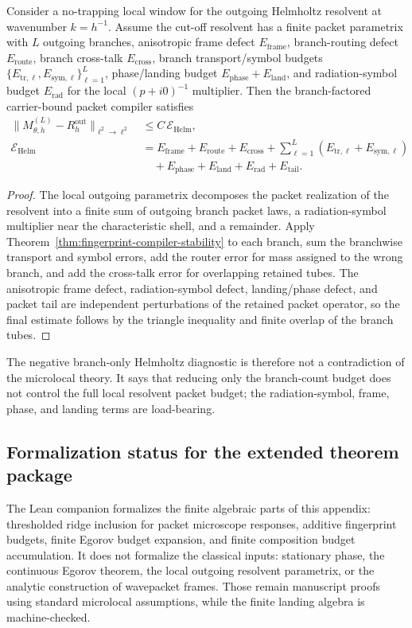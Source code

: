 \begin{theorem}
\label{thm:local-helmholtz-packet-budget}
Consider a no-trapping local window for the outgoing Helmholtz resolvent at
wavenumber $k=h^{-1}$.  Assume the cut-off resolvent has a finite packet
parametrix with $L$ outgoing branches, anisotropic frame defect
$E_{\mathrm{frame}}$, branch-routing defect $E_{\mathrm{route}}$, branch
cross-talk $E_{\mathrm{cross}}$, branch transport/symbol budgets
$\{E_{\mathrm{tr},\ell},E_{\mathrm{sym},\ell}\}_{\ell=1}^L$, phase/landing
budget $E_{\mathrm{phase}}+E_{\mathrm{land}}$, and radiation-symbol budget
$E_{\mathrm{rad}}$ for the local $(p+i0)^{-1}$ multiplier.  Then the
branch-factored carrier-bound packet compiler satisfies
\[
\begin{aligned}
\|M_{\theta,h}^{(L)}-R_h^{\mathrm{out}}\|_{\ell^2\to\ell^2}
&\le C\,\mathcal E_{\mathrm{Helm}},\\
\mathcal E_{\mathrm{Helm}}
&=
E_{\mathrm{frame}}+E_{\mathrm{route}}+E_{\mathrm{cross}}
+\sum_{\ell=1}^L(E_{\mathrm{tr},\ell}+E_{\mathrm{sym},\ell})\\
&\quad
+E_{\mathrm{phase}}+E_{\mathrm{land}}+E_{\mathrm{rad}}
+E_{\mathrm{tail}} .
\end{aligned}
\]
\end{theorem}

\begin{proof}
The local outgoing parametrix decomposes the packet realization of the
resolvent into a finite sum of outgoing branch packet laws, a radiation-symbol
multiplier near the characteristic shell, and a remainder.  Apply
Theorem~\ref{thm:fingerprint-compiler-stability} to each branch, sum the
branchwise transport and symbol errors, add the router error for mass assigned
to the wrong branch, and add the cross-talk error for overlapping retained
tubes.  The anisotropic frame defect, radiation-symbol defect, landing/phase
defect, and packet tail are independent perturbations of the retained packet
operator, so the final estimate follows by the triangle inequality and finite
overlap of the branch tubes.
\end{proof}

The negative branch-only Helmholtz diagnostic is therefore not a contradiction
of the microlocal theory.  It says that reducing only the branch-count budget
does not control the full local resolvent packet budget; the radiation-symbol,
frame, phase, and landing terms are load-bearing.

\subsection{Formalization status for the extended theorem package}

The Lean companion formalizes the finite algebraic parts of this appendix:
thresholded ridge inclusion for packet microscope responses, additive
fingerprint budgets, finite Egorov budget expansion, and finite composition
budget accumulation.  It does not formalize the classical inputs: stationary
phase, the continuous Egorov theorem, the local outgoing resolvent parametrix,
or the analytic construction of wavepacket frames.  Those remain manuscript
proofs using standard microlocal assumptions, while the finite landing algebra
is machine-checked.
